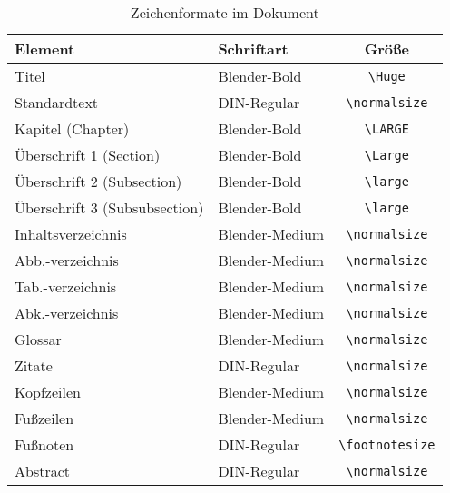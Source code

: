 \begin{table}[h]
	\centering
	\caption{Zeichenformate im Dokument}
	\label{tab:zeichenformate}
	\begin{tabular}{|l|l|c|}
		\hline
		\textbf{Element}              & \textbf{Schriftart} & \textbf{Größe}                       \\
		\hline
		Titel                         & Blender-Bold        & \texttt{\textbackslash Huge}         \\
		Standardtext                  & DIN-Regular         & \texttt{\textbackslash normalsize}   \\
		Kapitel (Chapter)             & Blender-Bold        & \texttt{\textbackslash LARGE}        \\
		Überschrift 1 (Section)       & Blender-Bold        & \texttt{\textbackslash Large}        \\
		Überschrift 2 (Subsection)    & Blender-Bold        & \texttt{\textbackslash large}        \\
		Überschrift 3 (Subsubsection) & Blender-Bold        & \texttt{\textbackslash large}        \\
		\hline
		Inhaltsverzeichnis            & Blender-Medium      & \texttt{\textbackslash normalsize}   \\
		Abb.-verzeichnis              & Blender-Medium      & \texttt{\textbackslash normalsize}   \\
		Tab.-verzeichnis              & Blender-Medium      & \texttt{\textbackslash normalsize}   \\
		Abk.-verzeichnis              & Blender-Medium      & \texttt{\textbackslash normalsize}   \\
		Glossar                       & Blender-Medium      & \texttt{\textbackslash normalsize}   \\
		\hline
		Zitate                        & DIN-Regular         & \texttt{\textbackslash normalsize}   \\
		Kopfzeilen                    & Blender-Medium      & \texttt{\textbackslash normalsize}   \\
		Fußzeilen                     & Blender-Medium      & \texttt{\textbackslash normalsize}   \\
		Fußnoten                      & DIN-Regular         & \texttt{\textbackslash footnotesize} \\
		Abstract                      & DIN-Regular         & \texttt{\textbackslash normalsize}   \\
		\hline
	\end{tabular}
\end{table}

